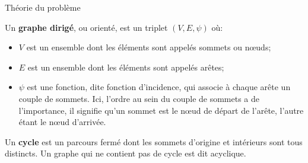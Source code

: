 \begin{frame}[allowframebreaks]{Théorie du problème}

Un \textbf{graphe dirigé}, ou orienté, est un triplet $(V,E,\psi)$ où:
\begin{itemize}
\item $V$ est un ensemble dont les éléments sont appelés sommets ou nœuds;
\item $E$ est un ensemble dont les éléments sont appelés arêtes;
\item $\psi$ est une fonction, dite fonction d'incidence, qui associe à chaque arête un couple de sommets. Ici, l'ordre au sein du couple de sommets a de l'importance, il signifie qu'un sommet est le nœud de départ de l'arête, l'autre étant le nœud d'arrivée.\\
\end{itemize}



\hspace{0.5cm}

Un \textbf{cycle} est un parcours fermé dont les sommets d'origine et intérieurs sont tous distincts. Un graphe qui ne contient pas de cycle est dit acyclique.

\end{frame}
